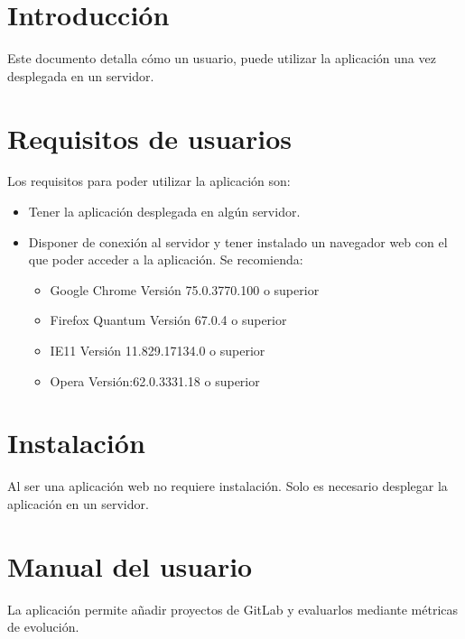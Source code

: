 \label{anex:D}

\section{Introducción}
Este documento detalla cómo un usuario, puede utilizar la aplicación una vez desplegada en un servidor.
\section{Requisitos de usuarios}
Los requisitos para poder utilizar la aplicación son:
\begin{itemize}
	\tightlist
	\item Tener la aplicación desplegada en algún servidor.
	\item Disponer de conexión al servidor y tener instalado un navegador web con el que poder acceder a la aplicación. Se recomienda:
	\begin{itemize}
		\tightlist
		\item Google Chrome Versión 75.0.3770.100 o superior
		\item Firefox Quantum Versión 67.0.4 o superior
		\item IE11 Versión 11.829.17134.0 o superior
		\item Opera Versión:62.0.3331.18 o superior
	\end{itemize}
\end{itemize}
\section{Instalación}
Al ser una aplicación web no requiere instalación. Solo es necesario desplegar la aplicación en un servidor.
\section{Manual del usuario}
La aplicación permite añadir proyectos de GitLab y evaluarlos mediante métricas de evolución.\\
